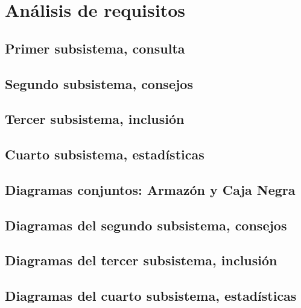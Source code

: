 \documentclass[a4paper, 11pt]{article}
\begin{document}
\newpage
\section{Análisis de requisitos}

\subsection{Primer subsistema, consulta}


\subsection{Segundo subsistema, consejos}


\subsection{Tercer subsistema, inclusión}


\subsection{Cuarto subsistema, estadísticas}


\newpage

\subsection{Diagramas conjuntos: Armazón y Caja Negra}


\newpage
\subsection{Diagramas del segundo subsistema, consejos}


\newpage

\subsection{Diagramas del tercer subsistema, inclusión}


\newpage


\subsection{Diagramas del cuarto subsistema, estadísticas}

\end{document}
